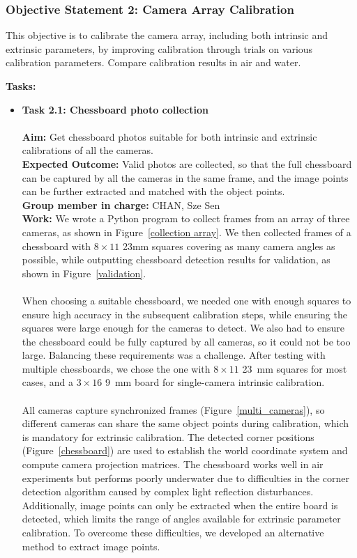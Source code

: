 \documentclass[11pt]{article}
\begin{document}
        \subsubsection{Objective Statement 2: Camera Array Calibration}
        This objective is to calibrate the camera array, including both intrinsic and extrinsic parameters, by improving calibration through trials on various calibration parameters. Compare calibration results in air and water.
        
        \textbf{Tasks:}
        \begin{itemize}
            \item \textbf{Task 2.1: Chessboard photo collection}\\\\
                \textbf{Aim:} Get chessboard photos suitable for both intrinsic and extrinsic calibrations of all the cameras.\\
                \textbf{Expected Outcome:} Valid photos are collected, so that the full chessboard can be captured by all the cameras in the same frame, and the image points can be further extracted and matched with the object points.\\
                \textbf{Group member in charge:} CHAN, Sze Sen\\
                \textbf{Work:} We wrote a Python program to collect frames from an array of three cameras, as shown in Figure~\ref{collection array}. We then collected frames of a chessboard with $8\times11$ 23mm squares covering as many camera angles as possible, while outputting chessboard detection results for validation, as shown in Figure~\ref{validation}.\\\\
                When choosing a suitable chessboard, we needed one with enough squares to ensure high accuracy in the subsequent calibration steps, while ensuring the squares were large enough for the cameras to detect. We also had to ensure the chessboard could be fully captured by all cameras, so it could not be too large. Balancing these requirements was a challenge. After testing with multiple chessboards, we chose the one with $8\times11$ 23~mm squares for most cases, and a $3\times16$ 9~mm board for single-camera intrinsic calibration.\\\\
                All cameras capture synchronized frames (Figure~\ref{multi_cameras}), so different cameras can share the same object points during calibration, which is mandatory for extrinsic calibration. The detected corner positions (Figure~\ref{chessboard}) are used to establish the world coordinate system and compute camera projection matrices. The chessboard works well in air experiments but performs poorly underwater due to difficulties in the corner detection algorithm caused by complex light reflection disturbances. Additionally, image points can only be extracted when the entire board is detected, which limits the range of angles available for extrinsic parameter calibration. To overcome these difficulties, we developed an alternative method to extract image points.

\end{itemize}
\end{document}
